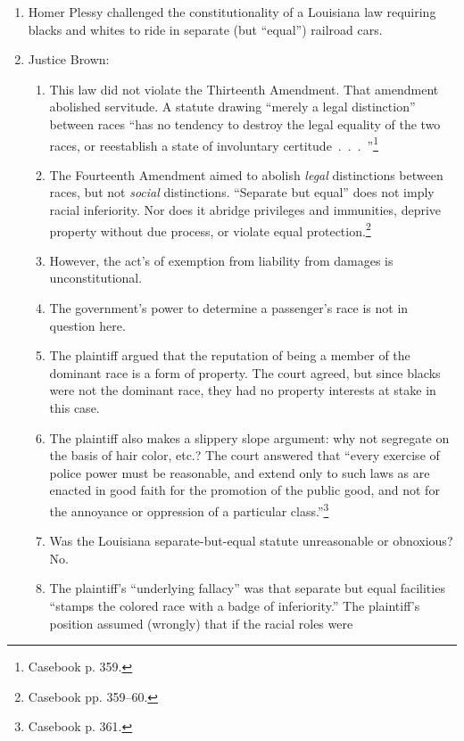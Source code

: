 \begin{enumerate}
    \item Homer Plessy challenged the constitutionality of a Louisiana law 
    requiring blacks and whites to ride in separate (but ``equal'') railroad 
    cars.
    \item Justice Brown:
    \begin{enumerate}
        \item This law did not violate the Thirteenth Amendment. That 
        amendment abolished servitude. A statute drawing ``merely a legal 
        distinction'' between races ``has no tendency to destroy the legal 
        equality of the two races, or reestablish a state of involuntary 
        certitude~.~.~.~''\footnote{Casebook p. 359.}
        \item The Fourteenth Amendment aimed to abolish \emph{legal} 
        distinctions between races, but not \emph{social} distinctions. 
        ``Separate but equal'' does not imply racial inferiority. Nor does it 
        abridge privileges and immunities, deprive property without due process, 
        or violate equal protection.\footnote{Casebook pp. 359--60.}
        \item However, the act's of exemption from liability from damages is 
        unconstitutional.  
        \item The government's power to determine a passenger's race is not in 
        question here.
        \item The plaintiff argued that the reputation of being a member of the 
        dominant race is a form of property. The court agreed, but since blacks 
        were not the dominant race, they had no property interests at stake in 
        this case.
        \item The plaintiff also makes a slippery slope argument: why not 
        segregate on the basis of hair color, etc.? The court answered that 
        ``every exercise of police power must be reasonable, and extend only to 
        such laws as are enacted in good faith for the promotion of the public 
        good, and not for the annoyance or oppression of a particular 
        class.''\footnote{Casebook p. 361.}
        \item Was the Louisiana separate-but-equal statute unreasonable or 
        obnoxious? No.
        \item The plaintiff's ``underlying fallacy'' was that separate but equal 
        facilities ``stamps the colored race with a badge of inferiority.'' The 
        plaintiff's position assumed (wrongly) that if the racial roles were 

\end{enumerate}
\end{enumerate}
